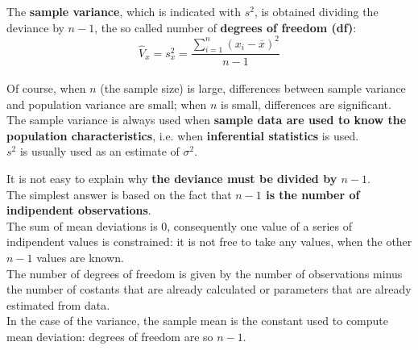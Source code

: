 \begin{frame}
  \vspace*{.2cm}
  The \textbf{sample variance}, which is indicated with {\boldmath$s^2$}, is obtained dividing the deviance by {\boldmath $n-1$}, the so called number of \textbf{degrees of freedom (df)}:\\
  \vspace*{.2cm}
  $$ \hat{V}_x = s_x^2 = \frac{\sum_{i=1}^n{\left(x_i-\overline{x}\right)^2}}{n-1} $$\\
  \vspace*{.2cm}
  Of course, when {\boldmath $ n $} (the sample size) is large, differences between sample variance and population variance are small; when {\boldmath $ n $} is small, differences are significant.\\
  \vspace*{.2cm}
  The sample variance is always used when \textbf{sample data are used to know the population characteristics}, i.e. when \textbf{inferential statistics} is used.\\
  \vspace*{.2cm}
  $s^2$ is usually used as an estimate of $\sigma^2$.
\end{frame}

\begin{frame}
  \begin{small}
    \vspace*{.1cm}
    It is not easy to explain why \textbf{the deviance must be divided by {\boldmath $ n-1 $}}.\\
    \vspace*{.2cm}
    The simplest answer is based on the fact that \textbf{{\boldmath $ n-1 $} is the number of indipendent observations}.\\
    \vspace*{.2cm}
    The sum of mean deviations is 0, consequently one value of a series of indipendent values is constrained: it is not free to take any values, when the other $ n-1 $ values are known.\\
    \vspace*{.2cm}
    The number of degrees of freedom is given by the number of observations minus the number of costants that are already calculated or parameters that are already estimated from data.\\
    \vspace*{.2cm}
    In the case of the variance, the sample mean is the constant used to compute mean deviation: degrees of freedom are so {\boldmath $ n-1 $}.\\
  \end{small}
\end{frame}

